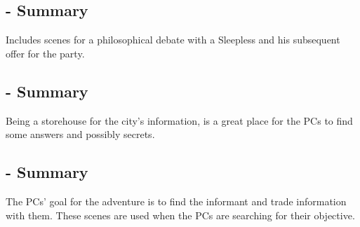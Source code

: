 \subsection{ - Summary}

Includes scenes for a philosophical debate with a Sleepless and his subsequent offer for the party.

\subsection{ - Summary}

Being a storehouse for the city's information, \locationIndicium{} is a great place for the PCs to find some answers and possibly secrets.

\subsection{ - Summary}

The PCs' goal for the adventure is to find the informant and trade information with them. These scenes are used when the PCs are searching for their objective.




\hypersetup{
	colorlinks,
	citecolor=black,
	filecolor=black,
	linkcolor=black,
	urlcolor=black
}